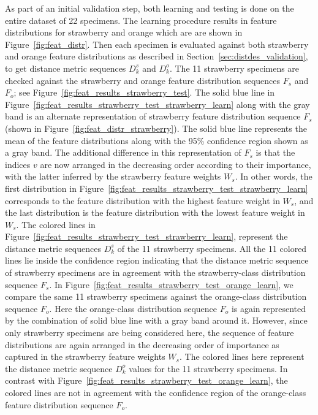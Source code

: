 \documentclass {udthesis}
\begin{document}
As part of an initial validation step, both learning and testing is done on the entire dataset of 22 specimens. The learning procedure
results in feature distributions for strawberry and orange which are are shown in Figure~\ref{fig:feat_distr}. Then each specimen is evaluated against both strawberry and orange feature distributions as described in Section~\ref{sec:distdes_validation}, to get distance metric sequences $D^s_k$ and $D^o_k$. The 11 strawberry specimens are checked against the strawberry and orange feature distribution sequences $F_{s}$ and $F_{o}$; see Figure~\ref{fig:feat_results_strawberry_test}. The solid blue line in Figure~\ref{fig:feat_results_strawberry_test_strawberry_learn} along with the gray band is an alternate representation of strawberry feature distribution sequence $F_{s}$ (shown in Figure~\ref{fig:feat_distr_strawberry}). The solid blue line represents the mean of the feature distributions along with the 95\% confidence region shown as a gray band. The additional difference in this representation of $F_s$ is that the indices $v$ are now arranged in the decreasing order according to their importance, with the latter inferred by the strawberry feature weights $W_s$. In other words, the first distribution in Figure~\ref{fig:feat_results_strawberry_test_strawberry_learn} corresponds to the feature distribution with the highest feature weight in $W_{s}$, and the 
last distribution is the 
feature distribution with the lowest feature weight in $W_{s}$. 
The colored lines in Figure~\ref{fig:feat_results_strawberry_test_strawberry_learn}, represent the distance metric sequences $D^s_k$ of the 11 strawberry specimens. 
All the 11 colored lines lie inside the confidence region indicating that the 
distance metric sequence of strawberry specimens are in agreement with the strawberry-class distribution sequence $F_{s}$.
In Figure~\ref{fig:feat_results_strawberry_test_orange_learn}, we compare the same 11 strawberry specimens against the orange-class distribution sequence $F_{o}$. Here the orange-class distribution sequence $F_{o}$ is again represented by the combination of solid blue line with a gray band around it. However, since only strawberry specimens are being considered here, the sequence of feature distributions are again arranged in the decreasing order of importance as captured in the strawberry feature weights $W_s$. The colored lines here represent the distance metric sequence $D^o_k$ values for the 11 strawberry specimens.
In contrast with Figure~\ref{fig:feat_results_strawberry_test_orange_learn}, the colored lines are not in agreement with the confidence region of the orange-class feature distribution sequence $F_{o}$.
\end{document}
